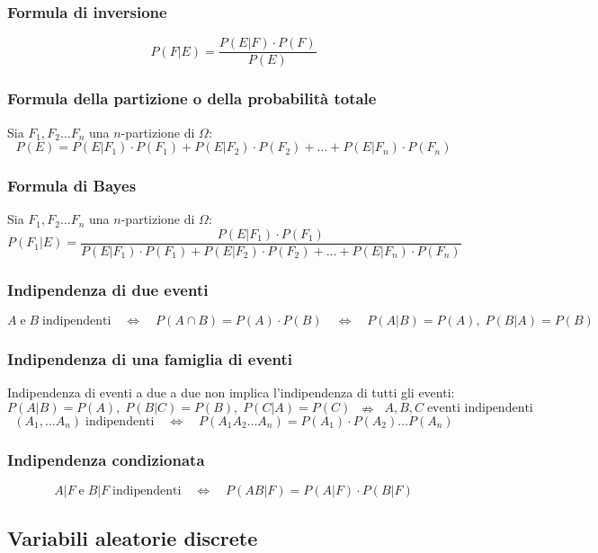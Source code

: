 \documentclass[a4paper]{article}
\begin{document}
\subsubsection*{Formula di inversione}
\[P(F | E) = \frac{P(E|F) \cdot P(F)}{P(E)}\]

\subsubsection*{Formula della partizione o della probabilità totale}
Sia \(F_1, F_2 \dots F_n\) una \(n\)-partizione di \(\Omega\):
\[P(E) = P(E|F_1) \cdot P(F_1) + P(E|F_2) \cdot P(F_2) + \dots + P(E|F_n) \cdot P(F_n)\]

\subsubsection*{Formula di Bayes}
Sia \(F_1, F_2 \dots F_n\) una \(n\)-partizione di \(\Omega\):
\[P(F_1 | E) = \frac{P(E | F_1) \cdot P(F_1)}{P(E|F_1) \cdot P(F_1) + P(E|F_2) \cdot P(F_2) + \dots + P(E|F_n) \cdot P(F_n)}\]

\subsubsection*{Indipendenza di due eventi}
\[A \; \text{e} \; B \; \text{indipendenti} \quad \Leftrightarrow \quad P(A \cap B) = P(A) \cdot P(B) \quad \Leftrightarrow \quad P(A|B) = P(A), \; P(B|A) = P(B)\]

\subsubsection*{Indipendenza di una famiglia di eventi}
Indipendenza di eventi a due a due non implica l'indipendenza di tutti gli eventi:
\[P(A|B) = P(A), \; P(B|C) = P(B), \; P(C|A) = P(C) \;\; \nRightarrow \;\; A, B, C \; \text{eventi indipendenti}\]
\[(A_1, \dots A_n) \; \text{indipendenti} \quad \Leftrightarrow \quad P(A_1 A_2 \dots A_n) = P(A_1) \cdot P(A_2) \dots P(A_n)\]

\subsubsection*{Indipendenza condizionata}
\[A|F \; \text{e} \; B|F \; \text{indipendenti} \quad \Leftrightarrow \quad P(AB|F) = P(A|F) \cdot P(B|F)\]

\newpage

\subsection{Variabili aleatorie discrete}
\end{document}
